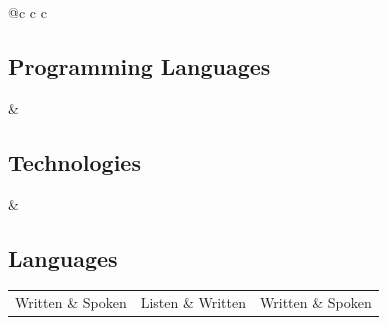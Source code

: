 \documentclass[a4paper]{deedy-resume-openfont}
\begin{document}
\begin{tabular}{@{}c c c}
    \begin{minipage}[t]{.2\textwidth}
        \subsection{Programming Languages}
        \sectionsep
    \end{minipage}
&
    \begin{minipage}[t]{.24\textwidth}
        \subsection{Technologies}
        \littlesectionsep
    \end{minipage}
&
    \begin{minipage}[t]{.56\textwidth}
        \subsection{Languages}
        \begin{tabular}{@{}c c c}
            \begin{minipage}[t]{.285\linewidth}
                \descript{English}
                \location{Advanced} Written \& Spoken
            \end{minipage}
            &
            \begin{minipage}[t]{.285\linewidth}
                \descript{Spanish}
                \location{Intermediate} Listen \& Written
            \end{minipage}
            &
            \begin{minipage}[t]{.285\linewidth}
                \descript{Portuguese}
                \location{Native fluency} Written \& Spoken
            \end{minipage}
        \end{tabular}
    \end{minipage}
\end{tabular}
\end{document}
